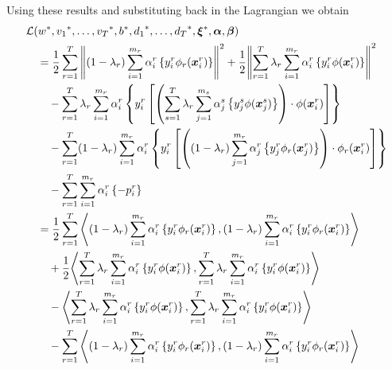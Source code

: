 Using these results and substituting back in the Lagrangian we obtain
\begin{equation}\nonumber
    \begin{aligned}
        & \lagr(\optim{{w}}, \optim{{v}_1}, \ldots, \optim{{v}_\ntasks}, \optim{b}, \optim{d_1}, \ldots, \optim{d_\ntasks}, \optim{\fv{\xi}}, \fv{\alpha}, \fv{\beta})\\
        &\quad=  \frac{1}{2} \sum_{r= 1}^T{\norm{ (1 - \lambda_r) \sum_{i=1}^{m_r}  {\alpha_i^r} \left\lbrace y_i^r \phi_r(\fv{x}_i^r) \right\rbrace}^2} + \frac{1}{2} {\norm{\sum_{r= 1}^T \lambda_r \sum_{i=1}^{m_r} {\alpha_i^r} \left\lbrace y_i^r \phi(\fv{x}_i^r) \right\rbrace}}^2 \\
        &\qquad - \sum_{r= 1}^T \lambda_r \sum_{i=1}^{m_r} \alpha_i^r \left\lbrace y_{i}^r \left[ \left(\sum_{s= 1}^T \lambda_r \sum_{j=1}^{m_s} {\alpha_j^s} \left\lbrace y_j^s \phi(\fv{x}_j^s) \right\rbrace \right) \cdot \phi(\fv{x}_{i}^r) \right]  \right\rbrace \\
        &\qquad -  \sum_{r= 1}^T (1-\lambda_r) \sum_{i=1}^{m_r} \alpha_i^r \left\lbrace y_{i}^r \left[  \left((1-\lambda_r) \sum_{j=1}^{m_r} {\alpha_j^r} \left\lbrace y_j^r \phi_r(\fv{x}_j^r) \right\rbrace \right) \cdot \phi_r(\fv{x}_{i}^r)  \right]  \right\rbrace \\
        &\qquad -  \sum_{r= 1}^T \sum_{i=1}^{m_r} \alpha_i^r \left\lbrace - p_{i}^r  \right\rbrace \\
        &\quad=  \frac{1}{2} \sum_{r= 1}^T{\dotp{(1-\lambda_r)\sum_{i=1}^{m_r} {\alpha_i^r} \left\lbrace y_i^r \phi_r(\fv{x}_i^r) \right\rbrace}{(1-\lambda_r)\sum_{i=1}^{m_r} {\alpha_i^r} \left\lbrace y_i^r \phi_r(\fv{x}_i^r) \right\rbrace}} \\
        &\qquad + \frac{1}{2} {\dotp{\sum_{r= 1}^\ntasks \lambda_r \sum_{i=1}^{m_r} {\alpha_i^r} \left\lbrace y_i^r \phi(\fv{x}_i^r) \right\rbrace}{\sum_{r= 1}^\ntasks \lambda_r \sum_{i=1}^{m_r} {\alpha_i^r} \left\lbrace y_i^r \phi(\fv{x}_i^r) \right\rbrace}} \\
        &\qquad - \dotp{ \sum_{r= 1}^T \lambda_r \sum_{i=1}^{m_r} {\alpha_i^r} \left\lbrace y_i^r \phi(\fv{x}_i^r) \right\rbrace}{ \sum_{r= 1}^T \lambda_r \sum_{i=1}^{m_r} {\alpha_i^r} \left\lbrace y_i^r \phi(\fv{x}_i^r) \right\rbrace} \\
        &\qquad -  \sum_{r= 1}^T {\dotp{(1-\lambda_r) \sum_{i=1}^{m_r} {\alpha_i^r} \left\lbrace y_i^r \phi_r(\fv{x}_i^r) \right\rbrace}{(1-\lambda_r) \sum_{i=1}^{m_r} {\alpha_i^r} \left\lbrace y_i^r \phi_r(\fv{x}_i^r) \right\rbrace}} \\

\end{aligned}
\end{equation}
